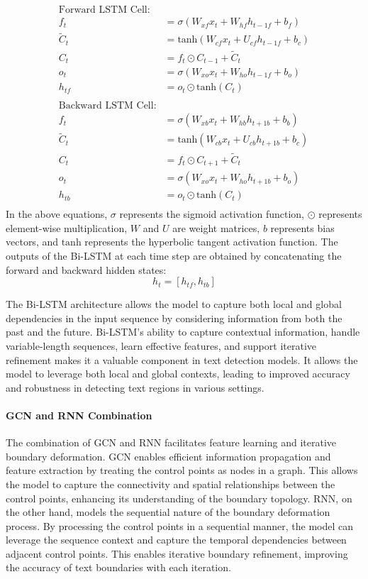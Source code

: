 \begin{equation}
\begin{aligned}
\text{Forward LSTM Cell:} \\
f_t &= \sigma(W_{xf}x_t + W_{hf}h_{t-1f} + b_f) \\
\tilde{C}_t &= \text{tanh}(W_{cf}x_t + U_{cf}h_{t-1f} + b_c) \\
C_t &= f_t \odot C_{t-1} + \tilde{C}_t \\
o_t &= \sigma(W_{xo}x_t + W_{ho}h_{t-1f} + b_o) \\
h_{tf} &= o_t \odot \text{tanh}(C_t) \\
\\
\text{Backward LSTM Cell:} \\
f_t &= \sigma(W_{xb}x_t + W_{hb}h_{t+1b} + b_b) \\
\tilde{C}_t &= \text{tanh}(W_{cb}x_t + U_{cb}h_{t+1b} + b_c) \\
C_t &= f_t \odot C_{t+1} + \tilde{C}_t \\
o_t &= \sigma(W_{xo}x_t + W_{ho}h_{t+1b} + b_o) \\
h_{tb} &= o_t \odot \text{tanh}(C_t) \\
\end{aligned}
\end{equation}
In the above equations, $\sigma$ represents the sigmoid activation function, $\odot$ represents element-wise multiplication, $W$ and $U$ are weight matrices, $b$ represents bias vectors, and $\text{tanh}$ represents the hyperbolic tangent activation function.
\hfill \break
The outputs of the Bi-LSTM at each time step are obtained by concatenating the forward and backward hidden states:
$$h_t = [h_{tf}, h_{tb}]$$

The Bi-LSTM architecture allows the model to capture both local and global dependencies in the input sequence by considering information from both the past and the future. Bi-LSTM's ability to capture contextual information, handle variable-length sequences, learn effective features, and support iterative refinement makes it a valuable component in text detection models. It allows the model to leverage both local and global contexts, leading to improved accuracy and robustness in detecting text regions in various settings.

\paragraph{GCN and RNN Combination}
The combination of GCN and RNN facilitates feature learning and iterative boundary deformation. GCN enables efficient information propagation and feature extraction by treating the control points as nodes in a graph. This allows the model to capture the connectivity and spatial relationships between the control points, enhancing its understanding of the boundary topology.
RNN, on the other hand, models the sequential nature of the boundary deformation process. By processing the control points in a sequential manner, the model can leverage the sequence context and capture the temporal dependencies between adjacent control points. This enables iterative boundary refinement, improving the accuracy of text boundaries with each iteration.

